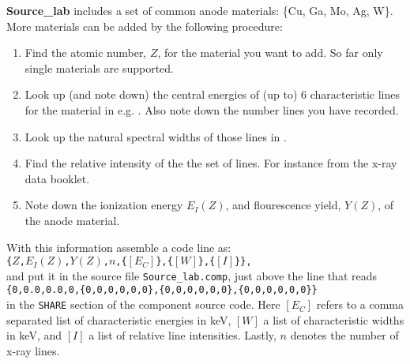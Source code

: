 \textbf{Source\_lab} includes a set of common anode materials: \{Cu, Ga, Mo, Ag, W\}. More materials can be added by the following procedure:
\begin{enumerate}
\item Find the atomic number, $Z$, for the material you want to add. So far only single materials are supported.
\item Look up (and note down) the central energies of (up to) 6 characteristic lines for the material in e.g. \cite{bearden1967x}. Also note down the number lines you have recorded.
\item Look up the natural spectral widths of those lines in \cite{krause1979natural}.
\item Find the relative intensity of the the set of lines. For instance from the x-ray data booklet.
\item Note down the ionization energy $E_I(Z)$, and flourescence yield, $Y(Z)$, of the anode material.
\end{enumerate}
With this information assemble a code line as:\\
\texttt{\{$Z$,$E_I(Z)$,$Y(Z)$,$n$,\{$[E_C]$\},\{$[W]$\},\{$[I]$\}\},}\\
 and put it in the source file \texttt{Source\_lab.comp}, just above the line that reads\\
\texttt{\{0,0.0,0.0,0,\{0,0,0,0,0,0\},\{0,0,0,0,0,0\},\{0,0,0,0,0,0\}\}}\\
in the \texttt{SHARE} section of the component source code.
Here $[E_C]$ refers to a comma separated list of characteristic energies in \si{keV}, $[W]$ a
list of characteristic widths in \si{keV}, and $[I]$ a list of relative line intensities.
Lastly, $n$ denotes the number of x-ray lines.
